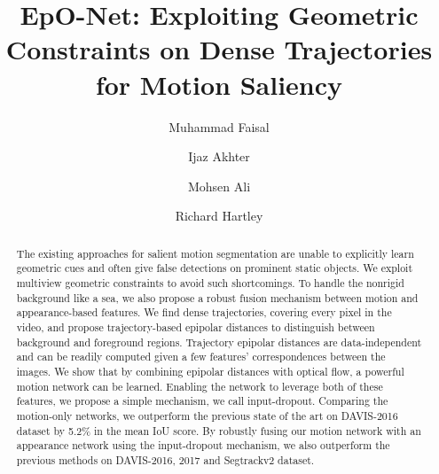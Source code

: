 \documentclass[10pt,twocolumn,letterpaper]{article}
\newcommand{\rowSpace}{\vspace{-0.4cm}}
\begin{document}
\title{EpO-Net: Exploiting Geometric Constraints on Dense Trajectories for Motion Saliency}
\author[1]{Muhammad Faisal}
\author[2]{Ijaz Akhter}
\author[1]{Mohsen Ali}
\author[3]{Richard Hartley}
\makeatletter
\renewcommand\AB@affilsepx{, \protect\Affilfont}
\makeatother
{} 


\maketitle
\ifwacvfinal\thispagestyle{empty}\fi



\begin{abstract}
   The existing approaches for salient motion segmentation are unable to explicitly learn geometric cues and often give false detections on prominent static objects. We exploit multiview geometric constraints to avoid such shortcomings. To handle the nonrigid background like a sea, we also propose a robust fusion mechanism between motion and appearance-based features. We find dense trajectories, covering every pixel in the video, and propose trajectory-based epipolar distances to distinguish between background and foreground regions. Trajectory epipolar distances are data-independent and can be readily computed given a few features' correspondences between the images. We show that by combining epipolar distances with optical flow, a powerful motion network can be learned. Enabling the network to leverage both of these features, we propose a simple mechanism, we call input-dropout. Comparing the motion-only networks, we outperform the previous state of the art on DAVIS-2016 dataset by 5.2\% in the mean IoU score. By robustly fusing our motion network with an appearance network using the input-dropout mechanism, we also outperform the previous methods on DAVIS-2016, 2017 and Segtrackv2 dataset.
\end{abstract}

\rowSpace
\end{document}
